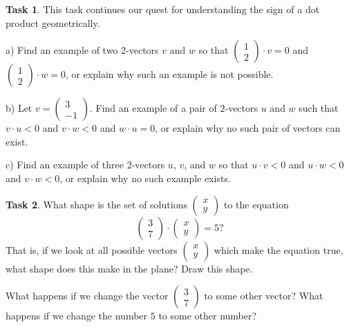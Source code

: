 \documentclass{tufte-book}
\theoremstyle{definition}
\newtheorem{task}{Task}
\begin{document}
\begin{task} This task continues our quest for understanding the sign of a dot product geometrically.
\begin{compactitem}
\item[a)] Find an example of two $2$-vectors $v$ and $w$ so that $\left(\begin{smallmatrix}1 \\ 2 \end{smallmatrix}\right)\cdot v =0$ and $\left(\begin{smallmatrix}1 \\ 2 \end{smallmatrix}\right)\cdot w = 0$, or explain why such an example is not possible.

\item[b)] Let $v = \left(\begin{smallmatrix}3\\-1 \end{smallmatrix}\right)$. Find an example of a pair of $2$-vectors $u$ and $w$ such that $v \cdot u < 0$ and $v \cdot w < 0$ and $w \cdot u = 0$, or explain why no such pair of vectors can exist.

\item[c)] Find an example of three $2$-vectors $u$, $v$, and $w$ so that $u \cdot v < 0$ and $u\cdot w < 0$ and $v \cdot w < 0$, or explain why no such example exists.
\end{compactitem}
\end{task}

\begin{task}
What shape is the set of solutions $\left(\begin{smallmatrix} x \\ y \end{smallmatrix}\right)$ to the equation
\[
\begin{pmatrix} 3 \\ 7\end{pmatrix} \cdot \begin{pmatrix} x \\ y \end{pmatrix} = 5?
\] 
That is, if we look at all possible vectors $\left(\begin{smallmatrix} x \\ y \end{smallmatrix}\right)$
which make the equation true, what shape does this make in the plane? Draw this shape.

What happens if we change the vector $\left(\begin{smallmatrix} 3 \\ 7 \end{smallmatrix}\right)$ to some other vector? What happens if we change the number $5$ to some other number?
\end{task}
\end{document}
